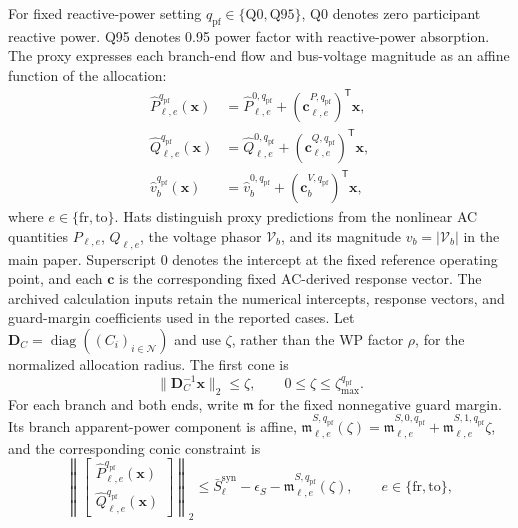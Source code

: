 \documentclass[11pt]{article}
\begin{document}
For fixed reactive-power setting
$q_{\mathrm{pf}}\in\{\mathrm{Q0},\mathrm{Q95}\}$, Q0 denotes zero participant
reactive power. Q95 denotes 0.95 power factor with reactive-power absorption.
The proxy expresses each branch-end flow and bus-voltage magnitude as an affine
function of the allocation:
\begin{equation}
\begin{aligned}
\widehat P_{\ell,e}^{q_{\mathrm{pf}}}(\mathbf x)
&=\widehat P_{\ell,e}^{0,q_{\mathrm{pf}}}
+(\mathbf c_{\ell,e}^{P,q_{\mathrm{pf}}})^{\mathsf T}\mathbf x,\\
\widehat Q_{\ell,e}^{q_{\mathrm{pf}}}(\mathbf x)
&=\widehat Q_{\ell,e}^{0,q_{\mathrm{pf}}}
+(\mathbf c_{\ell,e}^{Q,q_{\mathrm{pf}}})^{\mathsf T}\mathbf x,\\
\widehat v_b^{q_{\mathrm{pf}}}(\mathbf x)
&=\widehat v_b^{0,q_{\mathrm{pf}}}
+(\mathbf c_b^{V,q_{\mathrm{pf}}})^{\mathsf T}\mathbf x,
\end{aligned}
\label{eq:supp_affine_proxy_quantities}
\end{equation}
where $e\in\{\mathrm{fr},\mathrm{to}\}$. Hats distinguish proxy predictions
from the nonlinear AC quantities $P_{\ell,e}$, $Q_{\ell,e}$, the voltage
phasor $\mathcal V_b$, and its magnitude $v_b=|\mathcal V_b|$ in the
main paper. Superscript $0$ denotes the intercept at the fixed reference
operating point, and each $\mathbf c$ is the corresponding fixed AC-derived
response vector. The archived calculation inputs retain the numerical intercepts, response
vectors, and guard-margin coefficients used in the reported cases. Let
$\mathbf D_C=\operatorname{diag}((C_i)_{i\in\mathcal N})$ and use $\zeta$,
rather than the WP factor $\rho$, for the normalized allocation radius. The
first cone is
\begin{equation}
\|\mathbf D_C^{-1}\mathbf x\|_2\le\zeta,
\qquad 0\le\zeta\le\zeta_{\max}^{q_{\mathrm{pf}}}.
\label{eq:supp_radius_soc}
\end{equation}
For each branch and both ends, write $\mathfrak m$ for the fixed nonnegative
guard margin. Its branch apparent-power component is affine,
$\mathfrak m_{\ell,e}^{S,q_{\mathrm{pf}}}(\zeta)
=\mathfrak m_{\ell,e}^{S,0,q_{\mathrm{pf}}}
+\mathfrak m_{\ell,e}^{S,1,q_{\mathrm{pf}}}\zeta$, and the corresponding conic constraint is
\begin{equation}
\left\|
\begin{bmatrix}\widehat P_{\ell,e}^{q_{\mathrm{pf}}}(\mathbf x)\\
\widehat Q_{\ell,e}^{q_{\mathrm{pf}}}(\mathbf x)\end{bmatrix}
\right\|_2
\le \bar S_{\ell}^{\mathrm{syn}}-\epsilon_S
-\mathfrak m_{\ell,e}^{S,q_{\mathrm{pf}}}(\zeta),
\qquad e\in\{\mathrm{fr},\mathrm{to}\},
\label{eq:supp_branch_end_soc}
\end{equation}
\end{document}

